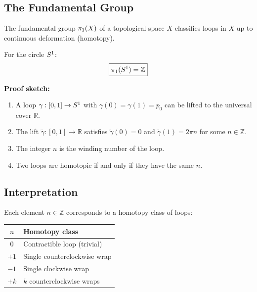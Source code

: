 \subsection{The Fundamental Group}

The fundamental group $\pi_1(X)$ of a topological space $X$ classifies loops
in $X$ up to continuous deformation (homotopy).

\begin{derivationbox}[title=Fundamental Group of the Circle]
    For the circle $S^1$:
    \begin{equation}
        \boxed{\pi_1(S^1) = \mathbb{Z}}
        \label{eq:pi1_S1}
    \end{equation}

    \textbf{Proof sketch:}
    \begin{enumerate}
        \item A loop $\gamma: [0,1] \to S^1$ with $\gamma(0) = \gamma(1) = p_0$
              can be lifted to the universal cover $\mathbb{R}$.
        \item The lift $\tilde{\gamma}: [0,1] \to \mathbb{R}$ satisfies
              $\tilde{\gamma}(0) = 0$ and $\tilde{\gamma}(1) = 2\pi n$
              for some $n \in \mathbb{Z}$.
        \item The integer $n$ is the winding number of the loop.
        \item Two loops are homotopic if and only if they have the same $n$.
    \end{enumerate}
    \tagDer
\end{derivationbox}

\subsection{Interpretation}

Each element $n \in \mathbb{Z}$ corresponds to a homotopy class of loops:
\begin{center}
\begin{tabular}{cl}
\toprule
$n$ & Homotopy class \\
\midrule
$0$ & Contractible loop (trivial) \\
$+1$ & Single counterclockwise wrap \\
$-1$ & Single clockwise wrap \\
$+k$ & $k$ counterclockwise wraps \\
\bottomrule
\end{tabular}
\end{center}


